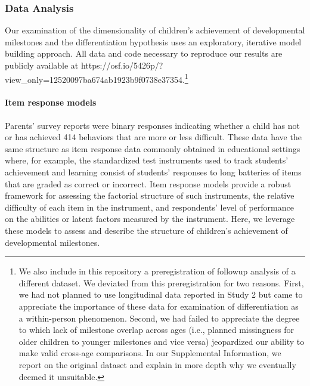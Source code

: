 \documentclass[man, floatsintext]{apa7}
\begin{document}
\subsubsection{Data Analysis}

Our examination of the dimensionality of children's achievement of developmental milestones  and the differentiation hypothesis uses an exploratory, iterative model building approach. All data and code necessary to reproduce our results are publicly available at https://osf.io/5426p/?view_only=12520097ba674ab1923b9f0738e37354.\footnote{We also include in this repository a preregistration of followup analysis of a different dataset. We deviated from this preregistration for two reasons. First, we had not planned to use longitudinal data reported in Study 2 but came to appreciate the importance of these data for examination of differentiation as a within-person phenomenon. Second, we had failed to appreciate the degree to which lack of milestone
overlap across ages (i.e., planned missingness for older children to
younger milestones and vice versa) jeopardized our ability to make valid cross-age
comparisons. In our Supplemental Information, we report on the original dataset and explain in more depth why we eventually deemed it unsuitable.}

\paragraph{Item response models}

Parents' survey reports were binary responses indicating whether a child has not or has achieved 414 behaviors that are more or less difficult. These data have the same structure as item response data commonly obtained in educational settings where, for example, the standardized test instruments used to track students' achievement and learning consist of students' responses to long batteries of items that are graded as correct or incorrect. Item response models provide a robust framework for assessing the factorial structure of such instruments, the relative difficulty of each item in the instrument, and respondents' level of performance on the abilities or latent factors measured by the instrument. Here, we leverage these models to assess and describe the structure of children's achievement of developmental milestones.
\end{document}
